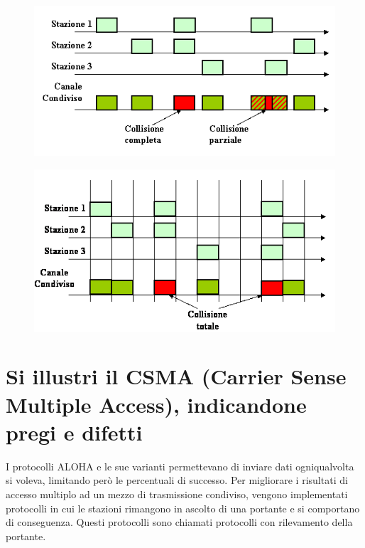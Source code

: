 \begin{figure}[H]
\centering
\includegraphics[scale=0.7]{res/img/22_ALOHA.png}
\end{figure}
\begin{figure}[H]
\centering
\includegraphics[scale=0.7]{res/img/22_ALOHASLOTTED.png}
\end{figure}

\section{Si illustri il CSMA (Carrier Sense Multiple Access), indicandone pregi e difetti}

I protocolli ALOHA e le sue varianti permettevano di inviare dati ogniqualvolta si voleva, limitando però le percentuali di successo. Per migliorare i risultati di accesso multiplo ad un mezzo di trasmissione condiviso, vengono implementati protocolli in cui le stazioni rimangono in ascolto di una portante e si comportano di conseguenza. Questi protocolli sono chiamati protocolli con rilevamento della portante.


